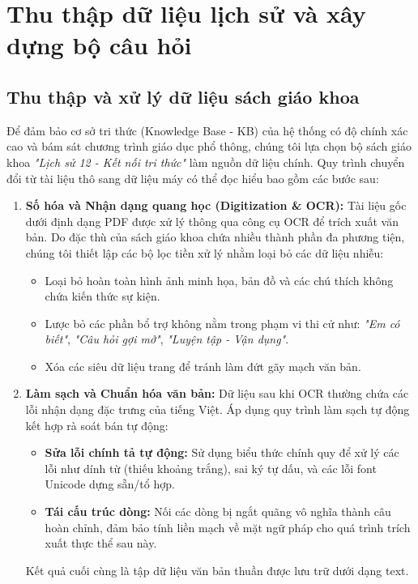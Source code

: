 \section{Thu thập dữ liệu lịch sử và xây dựng bộ câu hỏi}
\label{sec:data_collection}
\subsection{Thu thập và xử lý dữ liệu sách giáo khoa}
Để đảm bảo cơ sở tri thức (Knowledge Base - KB) của hệ thống có độ chính xác cao và bám sát chương trình giáo dục phổ thông, chúng tôi lựa chọn bộ sách giáo khoa \textit{"Lịch sử 12 - Kết nối tri thức"} làm nguồn dữ liệu chính. Quy trình chuyển đổi từ tài liệu thô sang dữ liệu máy có thể đọc hiểu bao gồm các bước sau:
\begin{enumerate}
    \item \textbf{Số hóa và Nhận dạng quang học (Digitization \& OCR):}
    Tài liệu gốc dưới định dạng PDF được xử lý thông qua công cụ OCR để trích xuất văn bản. Do đặc thù của sách giáo khoa chứa nhiều thành phần đa phương tiện, chúng tôi thiết lập các bộ lọc tiền xử lý nhằm loại bỏ các dữ liệu nhiễu:
    \begin{itemize}
        \item Loại bỏ hoàn toàn hình ảnh minh họa, bản đồ và các chú thích không chứa kiến thức sự kiện.
        \item Lược bỏ các phần bổ trợ không nằm trong phạm vi thi cử như: \textit{"Em có biết"}, \textit{"Câu hỏi gợi mở"}, \textit{"Luyện tập - Vận dụng"}.
        \item Xóa các siêu dữ liệu trang để tránh làm đứt gãy mạch văn bản.
    \end{itemize}
    
    \item \textbf{Làm sạch và Chuẩn hóa văn bản:}
    Dữ liệu sau khi OCR thường chứa các lỗi nhận dạng đặc trưng của tiếng Việt. Áp dụng quy trình làm sạch tự động kết hợp rà soát bán tự động:
    \begin{itemize}
        \item \textbf{Sửa lỗi chính tả tự động:} Sử dụng biểu thức chính quy để xử lý các lỗi như dính từ (thiếu khoảng trắng), sai ký tự dấu, và các lỗi font Unicode dựng sẵn/tổ hợp.
        \item \textbf{Tái cấu trúc dòng:} Nối các dòng bị ngắt quãng vô nghĩa thành câu hoàn chỉnh, đảm bảo tính liền mạch về mặt ngữ pháp cho quá trình trích xuất thực thể sau này.
    \end{itemize}
    Kết quả cuối cùng là tập dữ liệu văn bản thuần được lưu trữ dưới dạng text.
\end{enumerate}
